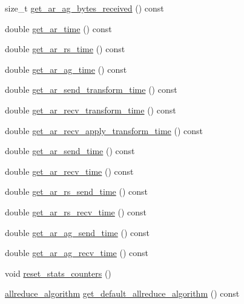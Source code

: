 \begin{DoxyCompactItemize}
\item 
size\+\_\+t \hyperlink{classlbann_1_1lbann__comm_a7aaeb171cd6f08926a6919e9a7892a73}{get\+\_\+ar\+\_\+ag\+\_\+bytes\+\_\+received} () const
\item 
double \hyperlink{classlbann_1_1lbann__comm_a29e966df9f8241bba47aa1663ce4151a}{get\+\_\+ar\+\_\+time} () const
\item 
double \hyperlink{classlbann_1_1lbann__comm_a3db95439bebabcc1648e50698d56dbaa}{get\+\_\+ar\+\_\+rs\+\_\+time} () const
\item 
double \hyperlink{classlbann_1_1lbann__comm_aca331207a61bf11d8979c2c06e20b6be}{get\+\_\+ar\+\_\+ag\+\_\+time} () const
\item 
double \hyperlink{classlbann_1_1lbann__comm_aed5d56c2b7205009c67ab37ea1c1556f}{get\+\_\+ar\+\_\+send\+\_\+transform\+\_\+time} () const
\item 
double \hyperlink{classlbann_1_1lbann__comm_afa5144a3d7bd40e1d78193d9f299e8ec}{get\+\_\+ar\+\_\+recv\+\_\+transform\+\_\+time} () const
\item 
double \hyperlink{classlbann_1_1lbann__comm_a893af1da4330be474871eeb8b2f9a7b5}{get\+\_\+ar\+\_\+recv\+\_\+apply\+\_\+transform\+\_\+time} () const
\item 
double \hyperlink{classlbann_1_1lbann__comm_a2643a3713d7c2ed64851fc345ba2273f}{get\+\_\+ar\+\_\+send\+\_\+time} () const
\item 
double \hyperlink{classlbann_1_1lbann__comm_a925aad805ceda573cd380b95b8c4a34a}{get\+\_\+ar\+\_\+recv\+\_\+time} () const
\item 
double \hyperlink{classlbann_1_1lbann__comm_a7222cd0613d9a94eafc89c51bfeae20d}{get\+\_\+ar\+\_\+rs\+\_\+send\+\_\+time} () const
\item 
double \hyperlink{classlbann_1_1lbann__comm_ab3474bd1c09ca432e302279acfd83307}{get\+\_\+ar\+\_\+rs\+\_\+recv\+\_\+time} () const
\item 
double \hyperlink{classlbann_1_1lbann__comm_a4482ccdfe56837dd4152c3a33f523a1c}{get\+\_\+ar\+\_\+ag\+\_\+send\+\_\+time} () const
\item 
double \hyperlink{classlbann_1_1lbann__comm_a78820c4fbd15df596d41844276cc966a}{get\+\_\+ar\+\_\+ag\+\_\+recv\+\_\+time} () const
\item 
void \hyperlink{classlbann_1_1lbann__comm_adb9afab1b8af03276e6e6347f8021ef5}{reset\+\_\+stats\+\_\+counters} ()
\item 
\hyperlink{classlbann_1_1lbann__comm_a02a03227cc27e3516f0d9f9812f32019}{allreduce\+\_\+algorithm} \hyperlink{classlbann_1_1lbann__comm_aafcb505629dd550ebd0b2c41792aca27}{get\+\_\+default\+\_\+allreduce\+\_\+algorithm} () const

\end{DoxyCompactItemize}

